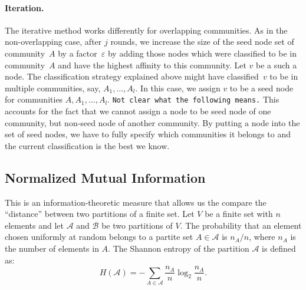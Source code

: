 \paragraph{Iteration.}
The iterative method works differently for overlapping communities.
As in the non-overlapping case, after $j$ rounds, we increase the size of the seed node set of 
community~$A$ by a factor~$\varepsilon$ by adding those nodes which were classified 
to be in community~$A$ and have the highest affinity to this community. Let $v$ be a such a node. 
The classification strategy explained above might have classified~$v$ 
to be in multiple communities, say, $A_1, \dots, A_l$. In this case, we assign $v$ 
to be a seed node for communities $A, A_1, \ldots, A_l$. 
\texttt{Not clear what the following means.}
This accounts for the fact 
that we cannot assign a node to be seed node of one community, but non-seed node of another community. By putting a node into the 
set of seed nodes, we have to fully specify which communities it belongs to and the 
current classification is the best we know.


\subsection{Normalized Mutual Information}
This is an information-theoretic measure that allows us the 
compare the ``distance'' between two partitions of a finite set. Let $V$ be a finite set 
with $n$ elements and let $\mathcal{A}$ and $\mathcal{B}$ be two partitions of $V$. The probability that an 
element chosen uniformly at random belongs to a partite set $A \in \mathcal{A}$ is $n_A/n$, where $n_A$ 
is the number of elements in $A$. The Shannon entropy of the partition $\mathcal{A}$ 
is defined as:
\begin{equation}\label{eqn:shannon_entropy}
H(\mathcal{A}) = - \sum_{A \in \mathcal{A}} \frac{n_A}{n} \log_2 \frac{n_A}{n}.
\end{equation}

